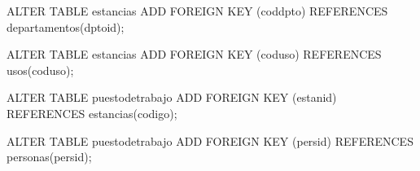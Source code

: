 \lstset{caption=Añadir claves ajenas,label=sql:crearForeignKey}
\begin{SQL}
ALTER TABLE estancias 
ADD FOREIGN KEY (coddpto) REFERENCES departamentos(dptoid);

ALTER TABLE estancias 
ADD FOREIGN KEY (coduso) REFERENCES usos(coduso);

ALTER TABLE puestodetrabajo 
ADD FOREIGN KEY (estanid) REFERENCES estancias(codigo);

ALTER TABLE puestodetrabajo 
ADD FOREIGN KEY (persid) REFERENCES personas(persid);
\end{SQL}
